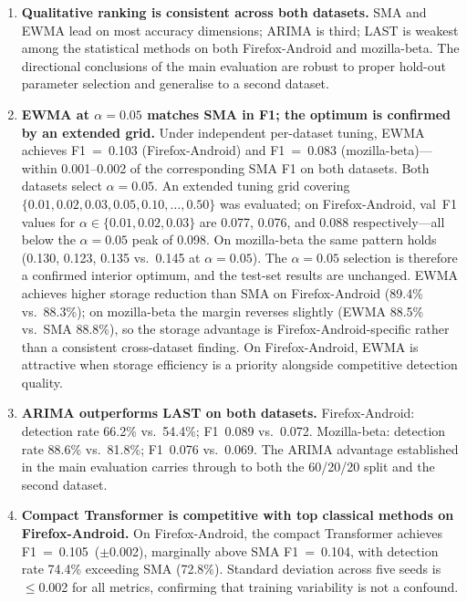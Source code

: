 \documentclass[a4paper,fleqn]{cas-sc}
\theoremstyle{plain}
\begin{document}
\begin{enumerate}
  \item \textbf{Qualitative ranking is consistent across both datasets.}
    SMA and EWMA lead on most accuracy dimensions; ARIMA is third; LAST
    is weakest among the statistical methods on both Firefox-Android and
    mozilla-beta.
    The directional conclusions of the main evaluation are robust to proper
    hold-out parameter selection and generalise to a second dataset.

  \item \textbf{EWMA at $\alpha=0.05$ matches SMA in F1; the optimum is confirmed by an extended grid.}
    Under independent per-dataset tuning, EWMA achieves F1~=~0.103
    (Firefox-Android) and F1~=~0.083 (mozilla-beta)---within 0.001--0.002
    of the corresponding SMA F1 on both datasets.
    Both datasets select $\alpha=0.05$.
    An extended tuning grid covering $\{0.01, 0.02, 0.03, 0.05, 0.10,
    \ldots, 0.50\}$ was evaluated; on Firefox-Android, val~F1 values for
    $\alpha \in \{0.01, 0.02, 0.03\}$ are 0.077, 0.076, and 0.088
    respectively---all below the $\alpha=0.05$ peak of 0.098.
    On mozilla-beta the same pattern holds
    (0.130, 0.123, 0.135 vs.\ 0.145 at $\alpha=0.05$).
    The $\alpha=0.05$ selection is therefore a confirmed interior optimum,
    and the test-set results are unchanged.
    EWMA achieves higher storage reduction than SMA on Firefox-Android
    (89.4\% vs.\ 88.3\%); on mozilla-beta the margin reverses slightly
    (EWMA 88.5\% vs.\ SMA 88.8\%), so the storage advantage is
    Firefox-Android-specific rather than a consistent cross-dataset finding.
    On Firefox-Android, EWMA is attractive when storage efficiency is a
    priority alongside competitive detection quality.

  \item \textbf{ARIMA outperforms LAST on both datasets.}
    Firefox-Android: detection rate 66.2\% vs.\ 54.4\%; F1~0.089 vs.\ 0.072.
    Mozilla-beta: detection rate 88.6\% vs.\ 81.8\%; F1~0.076 vs.\ 0.069.
    The ARIMA advantage established in the main evaluation carries through
    to both the 60/20/20 split and the second dataset.

  \item \textbf{Compact Transformer is competitive with top classical methods
    on Firefox-Android.}
    On Firefox-Android, the compact Transformer achieves
    F1~=~0.105~($\pm$0.002), marginally above SMA F1~=~0.104, with
    detection rate 74.4\% exceeding SMA (72.8\%).
    Standard deviation across five seeds is $\leq$0.002 for all metrics,
    confirming that training variability is not a confound.


\end{enumerate}
\end{document}
